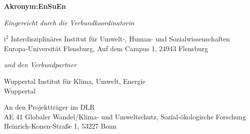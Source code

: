 \begin{center}
{\textbf{\textsf{}}
}

{\Huge
\textbf{\textsf{Akronym:{EnSuEn}}}
}

\vspace{1cm}

\textit{Eingereicht durch die Verbundkoordinatorin}

{\parskip 0pt
i$^{2}$ Interdisziplinäres Institut für Umwelt-, Human- und Sozialwissenschaften\\
Europa-Universität Flensburg, Auf dem Campus 1, 24943 Flensburg}

\vspace{0.3cm}

\textit{und den Verbundpartner}

{\parskip 0pt
Wuppertal Institut für Klima, Umwelt, Energie\\
Wuppertal}

\vspace{0.5cm}

An den Projektträger im DLR \\
AE 41 Globaler Wandel/Klima- und Umweltschutz, Sozial-ökologische Forschung \\
Heinrich-Konen-Straße 1, 53227 Bonn


\end{center}

\clearpage
